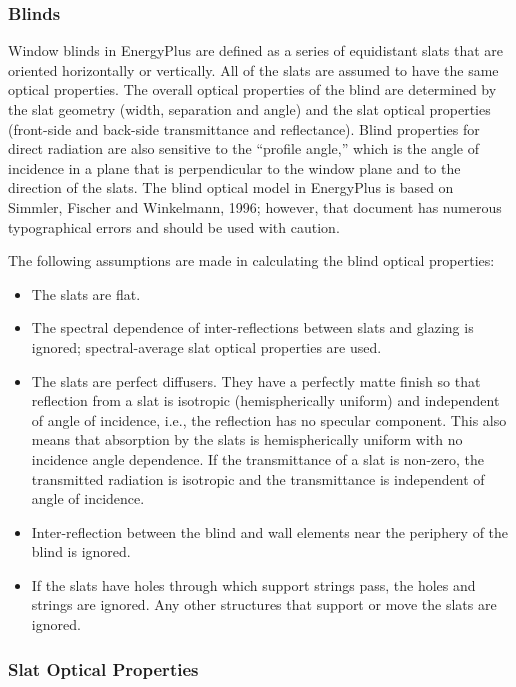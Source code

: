 \subsubsection{Blinds}\label{blinds}

Window blinds in EnergyPlus are defined as a series of equidistant slats that are oriented horizontally or vertically. All of the slats are assumed to have the same optical properties. The overall optical properties of the blind are determined by the slat geometry (width, separation and angle) and the slat optical properties (front-side and back-side transmittance and reflectance). Blind properties for direct radiation are also sensitive to the ``profile angle,'' which is the angle of incidence in a plane that is perpendicular to the window plane and to the direction of the slats. The blind optical model in EnergyPlus is based on Simmler, Fischer and Winkelmann, 1996; however, that document has numerous typographical errors and should be used with caution.

The following assumptions are made in calculating the blind optical properties:

\begin{itemize}
\item
  The slats are flat.
\item
  The spectral dependence of inter-reflections between slats and glazing is ignored; spectral-average slat optical properties are used.
\item
  The slats are perfect diffusers. They have a perfectly matte finish so that reflection from a slat is isotropic (hemispherically uniform) and independent of angle of incidence, i.e., the reflection has no specular component. This also means that absorption by the slats is hemispherically uniform with no incidence angle dependence. If the transmittance of a slat is non-zero, the transmitted radiation is isotropic and the transmittance is independent of angle of incidence.
\item
  Inter-reflection between the blind and wall elements near the periphery of the blind is ignored.
\item
  If the slats have holes through which support strings pass, the holes and strings are ignored. Any other structures that support or move the slats are ignored.
\end{itemize}

\subsubsection{Slat Optical Properties}\label{slat-optical-properties}

